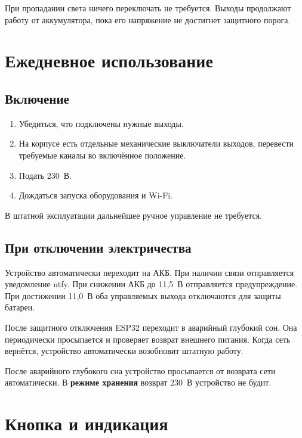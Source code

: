 \documentclass[10.5pt,a5paper]{article}
\begin{document}
\begin{infobox}[title=Нормальная работа]
При пропадании света ничего переключать не требуется. Выходы продолжают работу от аккумулятора, пока его напряжение не достигнет защитного порога.
\end{infobox}

\section{Ежедневное использование}

\subsection{Включение}
\begin{enumerate}
  \item Убедиться, что подключены нужные выходы.
  \item На корпусе есть отдельные механические выключатели выходов, перевести требуемые каналы во включённое положение.
  \item Подать 230~В.
  \item Дождаться запуска оборудования и Wi-Fi.
\end{enumerate}

В штатной эксплуатации дальнейшее ручное управление не требуется.

\subsection{При отключении электричества}
Устройство автоматически переходит на АКБ. При наличии связи отправляется уведомление ntfy. При снижении АКБ до 11,5~В отправляется предупреждение. При достижении 11,0~В оба управляемых выхода отключаются для защиты батареи.

После защитного отключения ESP32 переходит в аварийный глубокий сон. Она периодически просыпается и проверяет возврат внешнего питания. Когда сеть вернётся, устройство автоматически возобновит штатную работу.

\begin{warnbox}[title=Не путать с режимом хранения]
После аварийного глубокого сна устройство просыпается от возврата сети автоматически. В \textbf{режиме хранения} возврат 230~В устройство не будит.
\end{warnbox}

\section{Кнопка и индикация}
\end{document}
